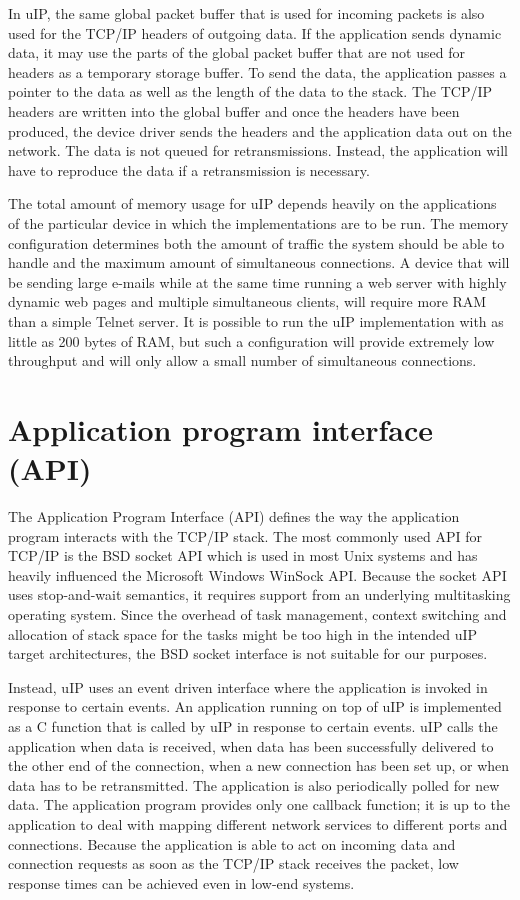 In u\-IP, the same global packet buffer that is used for incoming packets is also used for the TCP/IP headers of outgoing data. If the application sends dynamic data, it may use the parts of the global packet buffer that are not used for headers as a temporary storage buffer. To send the data, the application passes a pointer to the data as well as the length of the data to the stack. The TCP/IP headers are written into the global buffer and once the headers have been produced, the device driver sends the headers and the application data out on the network. The data is not queued for retransmissions. Instead, the application will have to reproduce the data if a retransmission is necessary.

The total amount of memory usage for u\-IP depends heavily on the applications of the particular device in which the implementations are to be run. The memory configuration determines both the amount of traffic the system should be able to handle and the maximum amount of simultaneous connections. A device that will be sending large e-mails while at the same time running a web server with highly dynamic web pages and multiple simultaneous clients, will require more RAM than a simple Telnet server. It is possible to run the u\-IP implementation with as little as 200 bytes of RAM, but such a configuration will provide extremely low throughput and will only allow a small number of simultaneous connections.\hypertarget{main_api}{}\section{Application program interface (API)}\label{main_api}
The Application Program Interface (API) defines the way the application program interacts with the TCP/IP stack. The most commonly used API for TCP/IP is the BSD socket API which is used in most Unix systems and has heavily influenced the Microsoft Windows Win\-Sock API. Because the socket API uses stop-and-wait semantics, it requires support from an underlying multitasking operating system. Since the overhead of task management, context switching and allocation of stack space for the tasks might be too high in the intended u\-IP target architectures, the BSD socket interface is not suitable for our purposes.

Instead, u\-IP uses an event driven interface where the application is invoked in response to certain events. An application running on top of u\-IP is implemented as a C function that is called by u\-IP in response to certain events. u\-IP calls the application when data is received, when data has been successfully delivered to the other end of the connection, when a new connection has been set up, or when data has to be retransmitted. The application is also periodically polled for new data. The application program provides only one callback function; it is up to the application to deal with mapping different network services to different ports and connections. Because the application is able to act on incoming data and connection requests as soon as the TCP/IP stack receives the packet, low response times can be achieved even in low-end systems.


